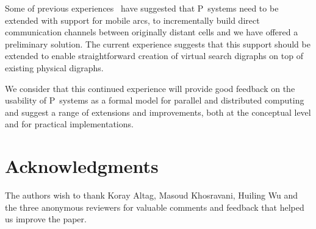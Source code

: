 \documentclass[preliminary,copyright,creativecommons]{eptcs}
\theoremstyle{remark}
\begin{document}
Some of previous experiences~\cite{DKN-MeCBIC2009,NDK-BWMC2009} have suggested that 
P~systems need to be extended with support for mobile arcs,
to incrementally build direct communication channels 
between originally distant cells and we have offered a preliminary solution.
The current experience suggests that this support should
be extended to enable straightforward creation of virtual 
search digraphs on top of existing physical digraphs.

We consider that this continued experience will provide good feedback on
the usability of P~systems as a formal model for parallel and distributed computing
and suggest a range of extensions and improvements, both at the conceptual level
and for practical implementations.


\section*{Acknowledgments}

The authors wish to thank Koray Altag, Masoud Khosravani, Huiling Wu 
and the three anonymous reviewers 
for valuable comments and feedback that helped us improve the paper.



  
\end{document}
